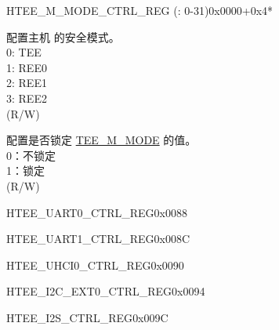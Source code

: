 \begin{register}{H}{TEE\_M\_MODE\_CTRL\_REG (: 0-31)}{0x0000+0x4*}\label{regdesc:TEEMNMODECTRLREG}
%
%
%
\regnewline%
\begin{regdesc}\begin{reglist}
\label{fielddesc:TEEMNMODE}\item [TEE\_M\regindex{n}\_MODE] 配置主机  的安全模式。\\
0: TEE \\
1: REE0 \\
2: REE1 \\
3: REE2  \\ 
(R/W)
\label{fielddesc:TEEMNLOCK}\item [TEE\_M\regindex{n}\_LOCK] 配置是否锁定 \hyperref[fielddesc:TEEMNMODE]{TEE\_M\_MODE} 的值。\\
0：不锁定\\
1：锁定  \\ 
(R/W)
\end{reglist}\end{regdesc}
\end{register}


\begin{register}{H}{TEE\_UART0\_CTRL\_REG}{0x0088}\label{regdesc:TEEUART0CTRLREG}
\end{register}\vspace{-3em}

\begin{register}{H}{TEE\_UART1\_CTRL\_REG}{0x008C}\label{regdesc:TEEUART1CTRLREG}
\end{register}\vspace{-3em}

\begin{register}{H}{TEE\_UHCI0\_CTRL\_REG}{0x0090}\label{regdesc:TEEUHCI0CTRLREG}
\end{register}\vspace{-3em}

\begin{register}{H}{TEE\_I2C\_EXT0\_CTRL\_REG}{0x0094}\label{regdesc:TEEI2CEXT0CTRLREG}
\end{register}\vspace{-3em}

\begin{register}{H}{TEE\_I2S\_CTRL\_REG}{0x009C}\label{regdesc:TEEI2SCTRLREG}
\end{register}\vspace{-3em}

